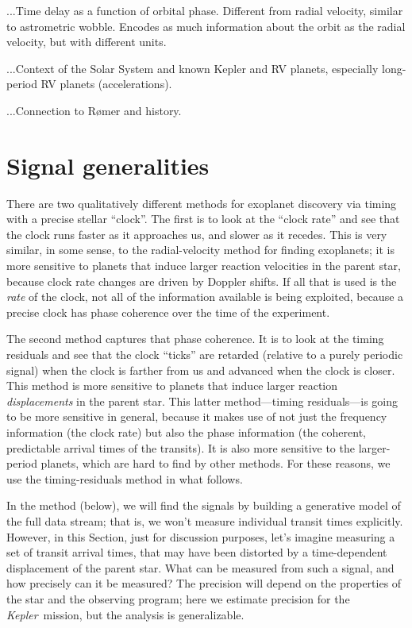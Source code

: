\documentclass[12pt, preprint]{aastex}
\newcommand{\sectionname}{Section}
\newcommand{\project}[1]{\textsl{#1}}
\newcommand{\Kepler}{\project{Kepler}}
\begin{document}
...Time delay as a function of orbital phase.  Different from radial
velocity, similar to astrometric wobble.  Encodes as much information
about the orbit as the radial velocity, but with different units.

...Context of the Solar System and known Kepler and RV planets, especially long-period RV planets (accelerations).

...Connection to R\o mer and history.

\section{Signal generalities}

There are two qualitatively different methods for exoplanet discovery
via timing with a precise stellar ``clock''.
The first is to look at the ``clock rate'' and see that the clock runs
faster as it approaches us, and slower as it recedes.
This is very similar, in some sense, to the radial-velocity method for
finding exoplanets; it is more sensitive to planets that induce larger
reaction velocities in the parent star, because clock rate changes are
driven by Doppler shifts.
If all that is used is the \emph{rate} of the clock, not all of the
information available is being exploited, because a precise clock has
phase coherence over the time of the experiment.

The second method captures that phase coherence.
It is to look at the timing residuals and see that the clock ``ticks''
are retarded (relative to a purely periodic signal) when the clock is
farther from us and advanced when the clock is closer.
This method is more sensitive to planets that induce larger reaction
\emph{displacements} in the parent star.
This latter method---timing residuals---is going to be more sensitive
in general, because it makes use of not just the frequency information
(the clock rate) but also the phase information (the coherent,
predictable arrival times of the transits).
It is also more sensitive to the larger-period planets, which are hard
to find by other methods.
For these reasons, we use the timing-residuals method in what follows.

In the method (below), we will find the signals by building a
generative model of the full data stream; that is, we won't measure
individual transit times explicitly.
However, in this \sectionname, just for discussion purposes, let's
imagine measuring a set of transit arrival times, that may have been
distorted by a time-dependent displacement of the parent star.  What
can be measured from such a signal, and how precisely can it be
measured?
The precision will depend on the properties of the star and the
observing program; here we estimate precision for the
\Kepler\ mission, but the analysis is generalizable.
\end{document}
